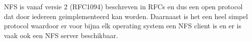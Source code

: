 NFS is vanaf versie 2 (RFC1094) beschreven in RFCs en dus een open protocol dat door iedereen geimplementeerd kan worden. Daarnaast is het een heel simpel protocol waardoor er voor bijna elk operating system een NFS client is en er is vaak ook een NFS server beschikbaar.
